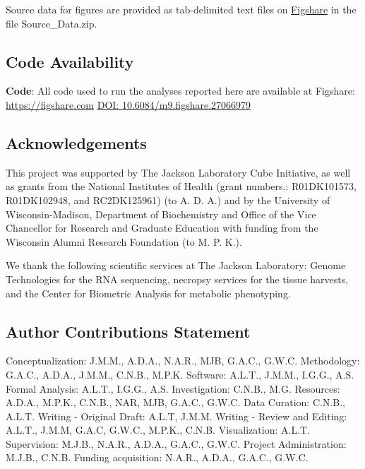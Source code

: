\documentclass[
]{article}
\begin{document}
Source data for figures are provided as tab-delimited text files on
\href{https://figshare.com/articles/dataset/Data_and_code_for_High-Dimensional_Mediation_Analysis_HDMA_in_diversity_outbred_mice/27066979}{Figshare}
in the file Source\_Data.zip.

\subsection{Code Availability}\label{code-availability}

\textbf{Code}: All code used to run the analyses reported here are
available at Figshare: \url{https://figshare.com}
\href{https://figshare.com/articles/dataset/Data_and_code_for_High-Dimensional_Mediation_Analysis_HDMA_in_diversity_outbred_mice/27066979}{DOI:
10.6084/m9.figshare.27066979} \cite{cube_data}

\pagebreak




\subsection{Acknowledgements}\label{acknowledgements}

This project was supported by The Jackson Laboratory Cube Initiative, as
well as grants from the National Institutes of Health (grant numbers.:
R01DK101573, R01DK102948, and RC2DK125961) (to A. D. A.) and by the
University of Wisconsin-Madison, Department of Biochemistry and Office
of the Vice Chancellor for Research and Graduate Education with funding
from the Wisconsin Alumni Research Foundation (to M. P. K.).

We thank the following scientific services at The Jackson Laboratory:
Genome Technologies for the RNA sequencing, necropsy services for the
tissue harvests, and the Center for Biometric Analysis for metabolic
phenotyping.

\subsection{Author Contributions
Statement}\label{author-contributions-statement}

Conceptualization: J.M.M., A.D.A., N.A.R., MJB, G.A.C., G.W.C.
Methodology: G.A.C., A.D.A., J.M.M., C.N.B., M.P.K. Software: A.L.T.,
J.M.M., I.G.G., A.S. Formal Analysis: A.L.T., I.G.G., A.S.
Investigation: C.N.B., M.G. Resources: A.D.A., M.P.K., C.N.B., NAR, MJB,
G.A.C., G.W.C. Data Curation: C.N.B., A.L.T. Writing - Original Draft:
A.L.T, J.M.M. Writing - Review and Editing: A.L.T., J.M.M, G.A.C,
G.W.C., M.P.K., C.N.B. Visualization: A.L.T. Supervision: M.J.B.,
N.A.R., A.D.A., G.A.C., G.W.C. Project Administration: M.J.B., C.N.B.
Funding acquisition: N.A.R., A.D.A., G.A.C., G.W.C.
\end{document}
